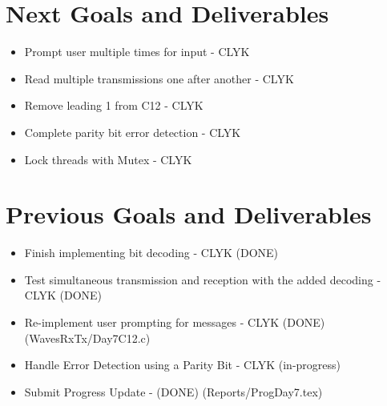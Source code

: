\documentclass{article}
\begin{document}
\section*{Next Goals and Deliverables}
\begin{itemize}
\item Prompt user multiple times for input - CLYK
\item Read multiple transmissions one after another - CLYK
\item Remove leading 1 from C12 - CLYK
\item Complete parity bit error detection - CLYK
\item Lock threads with Mutex - CLYK

\end{itemize}
\section*{Previous Goals and Deliverables}
\begin{itemize}
\item Finish implementing bit decoding - CLYK (DONE)
\item Test simultaneous transmission and reception with the added decoding - CLYK (DONE)
\item Re-implement user prompting for messages - CLYK (DONE) (WavesRxTx/Day7C12.c)
\item Handle Error Detection using a Parity Bit - CLYK (in-progress)

\item Submit Progress Update - (DONE) (Reports/ProgDay7.tex)
\end{itemize}
\end{document}

